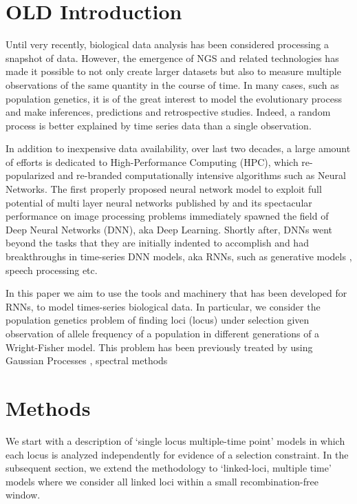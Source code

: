 \section{OLD Introduction}
Until very recently, biological data analysis has been considered processing a snapshot of data. However, the emergence of NGS and related technologies has made it possible to not only create larger datasets but also to measure multiple observations of the same quantity in the course of time. In many cases, such as population genetics, it is of the great interest to model the evolutionary process and make inferences, predictions and retrospective studies. Indeed, a random process is better explained by time series data than a single observation.

In addition to inexpensive data availability, over last two decades, a large amount of efforts is dedicated to High-Performance Computing (HPC), which re-popularized and re-branded computationally intensive algorithms such as Neural Networks. The first properly proposed neural network model to exploit full potential of multi layer neural networks published by \cite{deep-DR, deep-belief} and its spectacular performance on image processing problems immediately spawned the field of Deep Neural Networks (DNN), aka Deep Learning. Shortly after, DNNs went beyond the tasks that they are initially indented to accomplish \cite{deep-imagenet} and had breakthroughs in  time-series DNN models, aka RNNs, such as generative models \cite{deep-generative}, speech processing \cite{deep-speech} etc. 

In this paper we aim to use the tools and machinery that has been developed for RNNs, to model times-series biological data. In particular, we consider the population genetics problem of finding loci (locus) under selection given observation of allele frequency of a population in different generations of a Wright-Fisher model. This problem has been previously treated by using Gaussian Processes \cite{EnadR-GP}, spectral methods \cite{EandR-spectral}

\section{Methods}
We start with a description of `single locus multiple-time point'
models in which each locus is analyzed independently for evidence of a
selection constraint. In the subsequent section, we extend the
methodology to `linked-loci, multiple time' models where we consider
all linked loci within a small recombination-free window.

